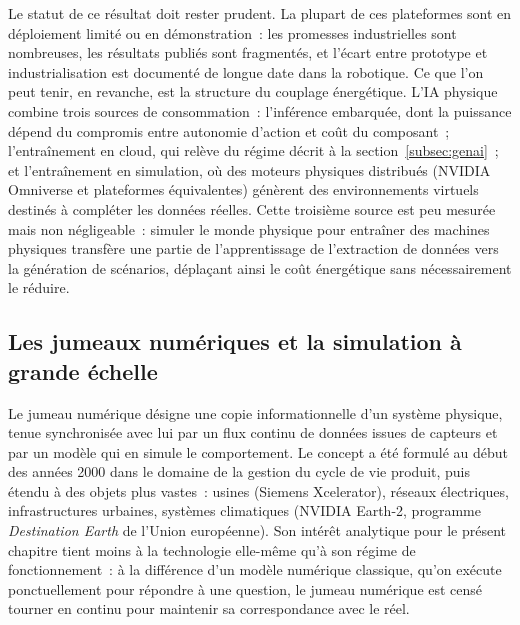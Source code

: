 %
Le statut de ce résultat doit rester prudent. La plupart de ces plateformes sont en déploiement limité ou en démonstration~: les promesses industrielles sont nombreuses, les résultats publiés sont fragmentés, et l'écart entre prototype et industrialisation est documenté de longue date dans la robotique. Ce que l'on peut tenir, en revanche, est la structure du couplage énergétique. L'IA physique combine trois sources de consommation~: l'inférence embarquée, dont la puissance dépend du compromis entre autonomie d'action et coût du composant~; l'entraînement en cloud, qui relève du régime décrit à la section~\ref{subsec:genai}~; et l'entraînement en simulation, où des moteurs physiques distribués (NVIDIA Omniverse et plateformes équivalentes) génèrent des environnements virtuels destinés à compléter les données réelles. Cette troisième source est peu mesurée mais non négligeable~: simuler le monde physique pour entraîner des machines physiques transfère une partie de l'apprentissage de l'extraction de données vers la génération de scénarios, déplaçant ainsi le coût énergétique sans nécessairement le réduire.


\subsection{Les jumeaux numériques et la simulation à grande échelle}\label{subsec:digital_twins}

%
Le jumeau numérique désigne une copie informationnelle d'un système physique, tenue synchronisée avec lui par un flux continu de données issues de capteurs et par un modèle qui en simule le comportement. Le concept a été formulé au début des années 2000 dans le domaine de la gestion du cycle de vie produit, puis étendu à des objets plus vastes~: usines (Siemens Xcelerator), réseaux électriques, infrastructures urbaines, systèmes climatiques (NVIDIA Earth-2, programme \emph{Destination Earth} de l'Union européenne). Son intérêt analytique pour le présent chapitre tient moins à la technologie elle-même qu'à son régime de fonctionnement~: à la différence d'un modèle numérique classique, qu'on exécute ponctuellement pour répondre à une question, le jumeau numérique est censé tourner en continu pour maintenir sa correspondance avec le réel.


